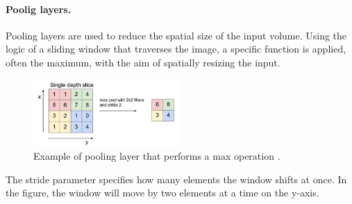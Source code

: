 \paragraph{Poolig layers.} Pooling layers are used to reduce the spatial size of the input volume. Using the logic of a sliding window that traverses the image, a specific function is applied, often the maximum, with the aim of spatially resizing the input.
\begin{figure}
    \centering
    \includegraphics[width=0.5\textwidth]{Images/pooling.png}
    \caption[Pooling layer.]{Example of pooling layer that performs a max operation \cite{giacomo_boracchi_convolutional_2021}.}
    \label{fig:poolingmax}
\end{figure}
The stride parameter specifies how many elements the window shifts at once. In the figure, the window will move by two elements at a time on the y-axis.
